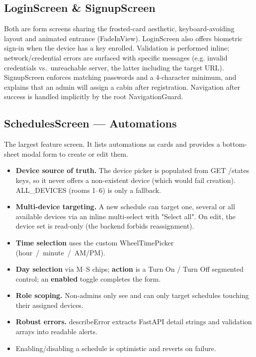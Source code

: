 \documentclass[11pt,a4paper]{article}
\newcommand{\code}[1]{\colorbox{codebg}{\ttfamily\small #1}}
\begin{document}
\subsection{LoginScreen \& SignupScreen}

Both are form screens sharing the frosted-card aesthetic, keyboard-avoiding
layout and animated entrance (\code{FadeInView}). \code{LoginScreen} also offers
biometric sign-in when the device has a key enrolled. Validation is performed
inline; network/credential errors are surfaced with specific messages (e.g.
invalid credentials vs.\ unreachable server, the latter including the target
URL).
\code{SignupScreen} enforces matching passwords and a 4-character minimum, and
explains that an admin will assign a cabin after registration. Navigation after
success is handled implicitly by the root \code{NavigationGuard}.

\subsection{SchedulesScreen — Automations}

The largest feature screen. It lists automations as cards and provides a
bottom-sheet modal form to create or edit them.

\begin{itemize}[leftmargin=1.4em]
  \item \textbf{Device source of truth.} The device picker is populated from
        \code{GET /states} keys, so it never offers a non-existent device (which
        would fail creation). \code{ALL\_DEVICES} (rooms 1--6) is only a fallback.
  \item \textbf{Multi-device targeting.} A new schedule can target one, several
        or all available devices via an inline multi-select with "Select all".
        On edit, the device set is read-only (the backend forbids reassignment).
  \item \textbf{Time selection} uses the custom \code{WheelTimePicker}
        (hour~/~minute~/~AM\slash PM).
  \item \textbf{Day selection} via M--S chips; \textbf{action} is a Turn On /
        Turn Off segmented control; an \textbf{enabled} toggle completes the form.
  \item \textbf{Role scoping.} Non-admins only see and can only target schedules
        touching their assigned devices.
  \item \textbf{Robust errors.} \code{describeError} extracts FastAPI
        \code{detail} strings and validation arrays into readable alerts.
  \item Enabling/disabling a schedule is optimistic and reverts on failure.
\end{itemize}
\end{document}
